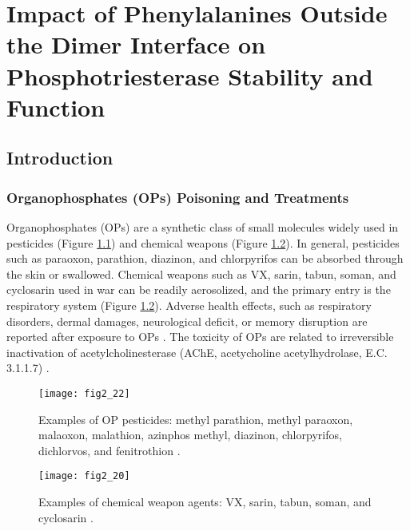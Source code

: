 \chapter{Impact of Phenylalanines Outside the Dimer Interface on
Phosphotriesterase Stability and Function}
\label{chap:dimer}
\begin{refsection}

\section{Introduction}

\subsection{Organophosphates (OPs) Poisoning and Treatments}

Organophosphates (OPs) are a synthetic class of small molecules widely used in
pesticides (Figure \ref{fig:pesticides}) and chemical weapons
\cite{Perezgasga2012,Ross2013b} (Figure \ref{fig:chem-weapon}). In general,
pesticides such as paraoxon, parathion, diazinon, and chlorpyrifos can be
absorbed through the skin or swallowed. Chemical weapons such as VX, sarin,
tabun, soman, and cyclosarin used in war can be readily aerosolized, and the
primary entry is the respiratory system \cite{Colovic2013b} (Figure
\ref{fig:chem-weapon}).  Adverse health effects, such as respiratory disorders,
dermal damages, neurological deficit, or memory disruption are reported after
exposure to OPs \cite{Ross2013b,Colovic2013b}.  The toxicity of OPs are related
to irreversible inactivation of acetylcholinesterase (AChE, acetycholine
acetylhydrolase, E.C.  3.1.1.7) \cite{Ross2013b}. 
\begin{figure}[htbp] \centering \texttt{[image: fig2\_22]}
    \caption[Examples of OP pesticides: methyl parathion, methyl paraoxon,
    malaoxon, malathion, azinphos methyl, diazinon, chlorpyrifos, dichlorvos,
and fenitrothion.] {Examples of OP pesticides: methyl parathion, methyl
    paraoxon, malaoxon, malathion, azinphos methyl, diazinon, chlorpyrifos,
    dichlorvos, and fenitrothion \cite{Colovic2013b}.} \label{fig:pesticides}
\end{figure}
\begin{figure}[htbp] \centering \texttt{[image: fig2\_20]}
    \caption[Examples of chemical weapon agents: VX, sarin, tabun, soman, and
    cyclosarin.] {Examples of chemical weapon agents: VX, sarin, tabun, soman,
        and cyclosarin \cite{Colovic2013b}.} \label{fig:chem-weapon}
\end{figure}


\end{refsection}
